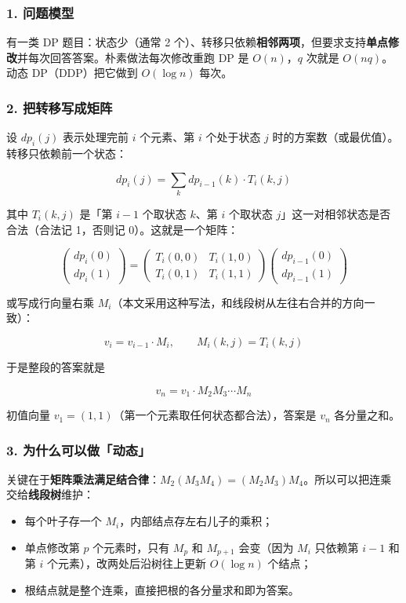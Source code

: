 \subsubsection*{1. 问题模型}

有一类 DP 题目：状态少（通常 2 个）、转移只依赖\textbf{相邻两项}，但要求支持\textbf{单点修改}并每次回答答案。朴素做法每次修改重跑 DP 是 $O(n)$，$q$ 次就是 $O(nq)$。动态 DP（DDP）把它做到 $O(\log n)$ 每次。

\subsubsection*{2. 把转移写成矩阵}

设 $dp_i(j)$ 表示处理完前 $i$ 个元素、第 $i$ 个处于状态 $j$ 时的方案数（或最优值）。转移只依赖前一个状态：

$$dp_i(j)=\sum_{k} dp_{i-1}(k)\cdot T_i(k,j)$$

其中 $T_i(k,j)$ 是「第 $i-1$ 个取状态 $k$、第 $i$ 个取状态 $j$」这一对相邻状态是否合法（合法记 1，否则记 0）。这就是一个矩阵：

$$\begin{pmatrix}dp_i(0)\\dp_i(1)\end{pmatrix}=\begin{pmatrix}T_i(0,0)&T_i(1,0)\\T_i(0,1)&T_i(1,1)\end{pmatrix}\begin{pmatrix}dp_{i-1}(0)\\dp_{i-1}(1)\end{pmatrix}$$

或写成行向量右乘 $M_i$（本文采用这种写法，和线段树从左往右合并的方向一致）：

$$v_i=v_{i-1}\cdot M_i,\qquad M_i(k,j)=T_i(k,j)$$

于是整段的答案就是

$$v_n=v_1\cdot M_2M_3\cdots M_n$$

初值向量 $v_1=(1,1)$（第一个元素取任何状态都合法），答案是 $v_n$ 各分量之和。

\subsubsection*{3. 为什么可以做「动态」}

关键在于\textbf{矩阵乘法满足结合律}：$M_2(M_3M_4)=(M_2M_3)M_4$。所以可以把连乘交给\textbf{线段树}维护：

\begin{itemize}
    \item 每个叶子存一个 $M_i$，内部结点存左右儿子的乘积；
    \item 单点修改第 $p$ 个元素时，只有 $M_{p}$ 和 $M_{p+1}$ 会变（因为 $M_i$ 只依赖第 $i-1$ 和第 $i$ 个元素），改两处后沿树往上更新 $O(\log n)$ 个结点；
    \item 根结点就是整个连乘，直接把根的各分量求和即为答案。
\end{itemize}

